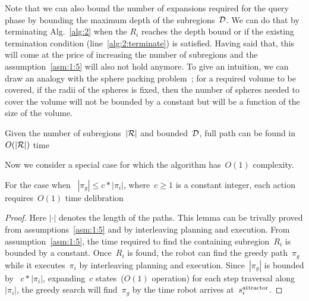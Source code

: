 \documentclass[a4paper]{report}
\begin{document}
Note that we can also bound the number of expansions required for the query phase by bounding the maximum depth of the subregions~$\mathcal{D}$. We can do that by terminating Alg.~\ref{alg:2} when the $R_i$ reaches the depth bound or if the existing termination condition (line~\ref{alg:2:terminate}) is satisfied. Having said that, this will come at the price of increasing the number of subregions and the assumption~\ref{asm:1:5} will also not hold anymore. To give an intuition, we can draw an analogy with the sphere packing problem~\cite{hales1992sphere}; for a required volume to be covered, if the radii of the spheres is fixed, then the number of spheres needed to cover the volume will not be bounded by a constant but will be a function of the size of the volume.

\vspace{2mm}
\begin{lemma}
\label{lemma:OrderR}
	Given the number of subregions~$|\mathcal{R}|$ and bounded~$\mathcal{D}$, full path can be found in~$O(|\mathcal{R}|)$ time
\end{lemma}

Now we consider a special case for which the algorithm has~$O(1)$ complexity.

\vspace{2mm}
\begin{lemma}
\label{lemma:o1}
	For the case when ~$|\pi_g| \leq c*|\pi_i|$, where~$c \geq 1$ is a constant integer, each action requires~$O(1)$ time delibration
\end{lemma}

\begin{proof}
	Here $|\cdot|$ denotes the length of the paths. This lemma can be trivally proved from assumptions~\ref{asm:1:5} and by interleaving planning and execution. From assumption~\ref{asm:1:5}, the time required to find the containing subregion~$R_i$ is bounded by a constant. Once~$R_i$ is found, the robot can find the greedy path~$\pi_g$ while it executes~$\pi_i$ by interleaving planning and execution.
	Since~$|\pi_g|$ is bounded by ~$c*|\pi_i|$, expanding~$c$ states~($O(1)$ operation) for each step traversal along~$|\pi_i|$, the greedy search will find~$\pi_g$ by the time robot arrives at~$s^{\text{attractor}}_i$.	
%	
\end{proof}
\end{document}
